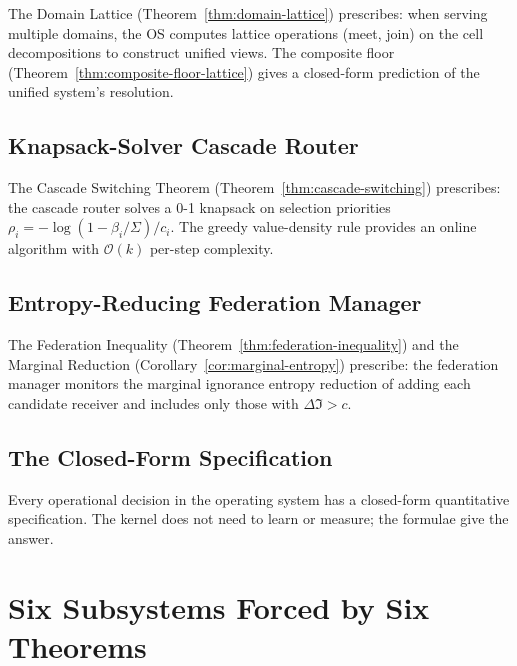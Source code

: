 \documentclass[twocolumn,11pt,a4paper]{article}
\newcommand{\Sigmax}{\Sigma}
\begin{document}
The Domain Lattice (Theorem~\ref{thm:domain-lattice}) prescribes: when serving multiple domains, the OS computes lattice operations (meet, join) on the cell decompositions to construct unified views. The composite floor (Theorem~\ref{thm:composite-floor-lattice}) gives a closed-form prediction of the unified system's resolution.

\subsection{Knapsack-Solver Cascade Router}

The Cascade Switching Theorem (Theorem~\ref{thm:cascade-switching}) prescribes: the cascade router solves a 0-1 knapsack on selection priorities $\rho_i = -\log(1 - \beta_i/\Sigmax)/c_i$. The greedy value-density rule provides an online algorithm with $\mathcal{O}(k)$ per-step complexity.

\subsection{Entropy-Reducing Federation Manager}

The Federation Inequality (Theorem~\ref{thm:federation-inequality}) and the Marginal Reduction (Corollary~\ref{cor:marginal-entropy}) prescribe: the federation manager monitors the marginal ignorance entropy reduction of adding each candidate receiver and includes only those with $\Delta \mathfrak{I} > c$.

\subsection{The Closed-Form Specification}

Every operational decision in the operating system has a closed-form quantitative specification. The kernel does not need to learn or measure; the formulae give the answer.

\section{Six Subsystems Forced by Six Theorems}
\label{sec:subsystem-mapping}
\end{document}
